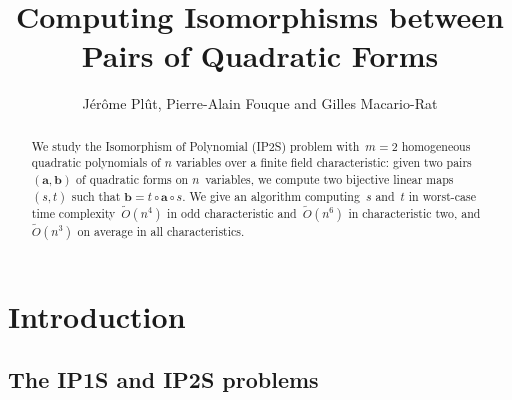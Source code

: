 \documentclass{lms}
\title[Pairs of quadratic forms]%
{Computing Isomorphisms between Pairs of Quadratic Forms}
\author[J. Plût, P.-A. Fouque and G. Macario-Rat]%
{Jérôme Plût, Pierre-Alain Fouque and Gilles Macario-Rat}
\def\Ot{\widetilde{O}}
\begin{document}
\maketitle
\begin{abstract}%
We study the Isomorphism of Polynomial (IP2S) problem
with~$m=2$ homogeneous quadratic polynomials of $n$ variables over a finite field
characteristic: given two pairs~$(\bm{a}, \bm{b})$
of quadratic forms on $n$~variables,
we compute two bijective linear maps $(s,t)$ such that
$\bm{b}=t\circ \bm{a}\circ s$.
We give an algorithm computing~$s$ and~$t$
in worst-case time complexity~$\Ot(n^4)$ in odd characteristic
and~$\Ot(n^6)$ in characteristic two,
and~$\Ot(n^3)$ on average in all characteristics.
% 
% 
\end{abstract}%
\maketitle
\section*{Introduction}
\subsection*{The IP1S and IP2S problems}
\end{document}
